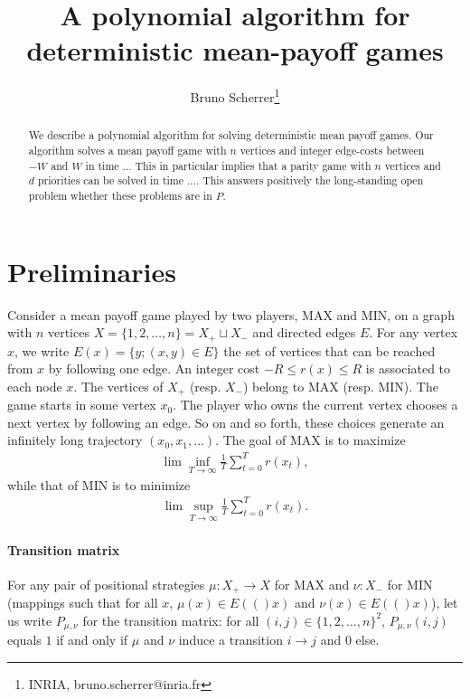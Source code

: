 \documentclass{article}
\title{A polynomial algorithm for deterministic mean-payoff games}
\author{Bruno Scherrer\footnote{INRIA, bruno.scherrer@inria.fr}}
\def\Xmax{X_{+}}
\def\Xmin{X_{-}}
\newcommand{\suc}[1]{E(#1)}
\begin{document}
\maketitle

\begin{abstract}
  We describe a polynomial algorithm for solving deterministic mean payoff games. Our algorithm solves a mean payoff game with $n$ vertices and integer edge-costs between $-W$ and $W$ in time ... This in particular implies that a parity game with $n$ vertices and $d$ priorities can be solved in time .... This answers positively the long-standing open problem whether these problems are in $P$.
\end{abstract}

\section{Preliminaries}

Consider a mean payoff game played by two players, MAX and MIN, on a graph with $n$ vertices $X=\{1,2,\dots,n\}=\Xmax \sqcup \Xmin$ and directed edges $E$. For any vertex $x$, we write $\suc{x}=\{y;(x,y) \in E\}$ the set of vertices that can be reached from $x$ by following one edge. An integer cost $-R \le r(x) \le R$ is associated to each node $x$. The vertices of $\Xmax$ (resp. $\Xmin$) belong to MAX (resp. MIN). The game starts in some vertex $x_0$. The player who owns the current vertex chooses a next vertex by following an edge. So on and so forth, these choices generate an infinitely long trajectory $(x_0,x_1,\dots)$. The goal of MAX is to maximize
\begin{align}
\lim\inf_{T \to \infty} \frac 1 T \sum_{t=0}^{T}  r(x_t),
\end{align}
while that of MIN is to minimize
\begin{align}
\lim\sup_{T \to \infty} \frac 1 T \sum_{t=0}^{T}  r(x_t).
\end{align}


\paragraph{Transition matrix}

For any pair of positional strategies $\mu:\Xmax \to X$ for MAX and $\nu:\Xmin$ for MIN (mappings such that for all $x$, $\mu(x) \in \suc(x)$ and $\nu(x) \in \suc(x)$), let us write $P_{\mu,\nu}$ for the transition matrix: for all $(i,j) \in \{1,2,\dots,n\}^2$, $P_{\mu,\nu}(i,j)$ equals $1$ if and only if $\mu$ and $\nu$ induce a transition $i \to j$ and $0$ else. 
\end{document}
